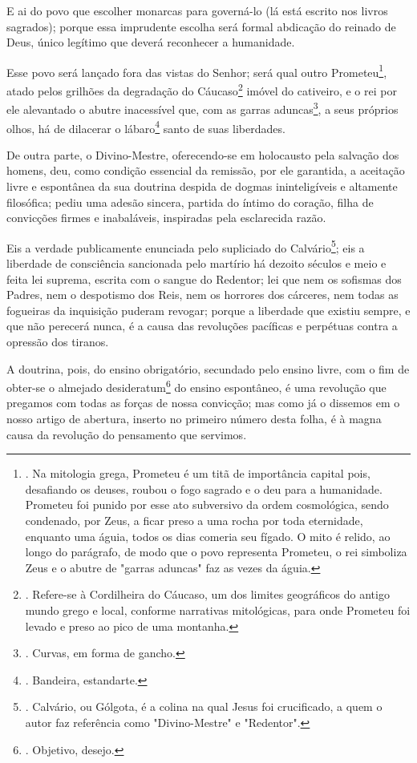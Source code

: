 E ai do povo que escolher monarcas para governá-lo (lá está escrito nos
livros sagrados); porque essa imprudente escolha será formal abdicação
do reinado de Deus, único legítimo que deverá reconhecer a humanidade.

Esse povo será lançado fora das vistas do Senhor; será qual outro
Prometeu\footnote{. Na mitologia grega, Prometeu é um titã de
  importância capital pois, desafiando os deuses, roubou o fogo sagrado
  e o deu para a humanidade. Prometeu foi punido por esse ato subversivo
  da ordem cosmológica, sendo condenado, por Zeus, a ficar preso a uma
  rocha por toda eternidade, enquanto uma águia, todos os dias comeria
  seu fígado. O mito é relido, ao longo do parágrafo, de modo que o povo
  representa Prometeu, o rei simboliza Zeus e o abutre de "garras
  aduncas" faz as vezes da águia.}, atado pelos grilhões da degradação
do Cáucaso\footnote{. Refere-se à Cordilheira do Cáucaso, um dos limites
  geográficos do antigo mundo grego e local, conforme narrativas
  mitológicas, para onde Prometeu foi levado e preso ao pico de uma
  montanha.} imóvel do cativeiro, e o rei por ele alevantado o abutre
inacessível que, com as garras aduncas\footnote{. Curvas, em forma de
  gancho.}, a seus próprios olhos, há de dilacerar o lábaro\footnote{.
  Bandeira, estandarte.} santo de suas liberdades.

De outra parte, o Divino-Mestre, oferecendo-se em holocausto pela
salvação dos homens, deu, como condição essencial da remissão, por ele
garantida, a aceitação livre e espontânea da sua doutrina despida de
dogmas ininteligíveis e altamente filosófica; pediu uma adesão sincera,
partida do íntimo do coração, filha de convicções firmes e inabaláveis,
inspiradas pela esclarecida razão.

Eis a verdade publicamente enunciada pelo supliciado do
Calvário\footnote{. Calvário, ou Gólgota, é a colina na qual Jesus foi
  crucificado, a quem o autor faz referência como "Divino-Mestre" e
  "Redentor".}; eis a liberdade de consciência sancionada pelo martírio
há dezoito séculos e meio e feita lei suprema, escrita com o sangue do
Redentor; lei que nem os sofismas dos Padres, nem o despotismo dos Reis,
nem os horrores dos cárceres, nem todas as fogueiras da inquisição
puderam revogar; porque a liberdade que existiu sempre, e que não
perecerá nunca, é a causa das revoluções pacíficas e perpétuas contra a
opressão dos tiranos.

A doutrina, pois, do ensino obrigatório, secundado pelo ensino livre,
com o fim de obter-se o almejado desideratum\footnote{. Objetivo,
  desejo.} do ensino espontâneo, é uma revolução que pregamos com todas
as forças de nossa convicção; mas como já o dissemos em o nosso artigo
de abertura, inserto no primeiro número desta folha, é à magna causa da
revolução do pensamento que servimos.

